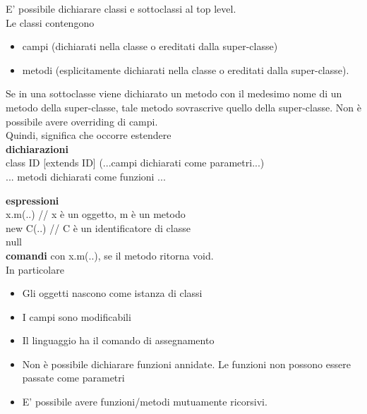 \documentclass[a4paper]{article}   %
\begin{document}
E' possibile dichiarare classi e sottoclassi al top level.\\
Le classi contengono
  \begin{itemize}
    \item campi (dichiarati nella classe o ereditati dalla super-classe)
    \item metodi (esplicitamente dichiarati nella classe o ereditati dalla super-classe).
  \end{itemize}
Se in una sottoclasse viene dichiarato un metodo con il medesimo nome
di un metodo della super-classe, tale metodo sovrascrive quello della
super-classe. Non è possibile avere overriding di campi.\\
Quindi, significa che occorre estendere\\


\textbf{dichiarazioni}\\

   class ID [extends ID] (...campi dichiarati come parametri...) {\\

     ... metodi dichiarati come funzioni ...\\

   }

\textbf{espressioni}\\

   x.m(..)          // x è un oggetto, m è un metodo\\

   new C(..)				// C è un identificatore di classe\\

   null\\

\textbf{comandi} con x.m(..), se il metodo ritorna void.\\

In particolare

\begin{itemize}

  \item Gli oggetti nascono come istanza di classi
  \item I campi sono modificabili
  \item Il linguaggio ha il comando di assegnamento
  \item Non è possibile dichiarare funzioni annidate. Le funzioni non possono
    essere passate come parametri
  \item E' possibile avere funzioni/metodi mutuamente ricorsivi.

\end{itemize}
\end{document}
